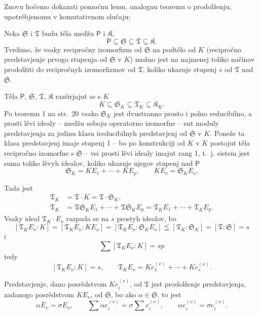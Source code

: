 \documentclass[11pt]{article}
\begin{document}
Znovu hočemo dokazati pomoćnu lemu, analognu teoremu o prodolženju, upotrěbjenomu v komutativnom slučaju:

Neka \(\mathfrak S\) i \(\mathfrak T\) budu těla medžu \(\mathsf P\) i \(\mathfrak K\),
\[
\mathsf P \subseteq \mathfrak S \subseteq \mathfrak T \subseteq \mathfrak K.
\]
Tvrdimo, že vsaky recipročny izomorfizm od \(\mathfrak S\) na podtělo od \(K\) (recipročno predstavjenje prvogo stupenja od \(\mathfrak S\) v \(K\)) možno jest na najmenej toliko načinov prodolžiti do recipročnyh izomorfizmov od \(\mathfrak T\), koliko ukazuje stupenj \(s\) od \(\mathfrak T\) nad \(\mathfrak S\).

Těla \(\mathsf P\), \(\mathfrak S\), \(\mathfrak T\), \(\mathfrak K\) razširjajut se s \(K\)
\[
K\subseteq \mathfrak S_K\subseteq \mathfrak T_K\subseteq \mathfrak K_K.
\]
Po teoremu 1 na str.~20 vsako \(\mathfrak S_K\) jest dvustranno prosto i polno reducibilno, a prosti lěvi idealy -- medžu soboju operatorno izomorfne -- sut moduly predstavjenja za jedinu klasu ireducibilnyh predstavjenj od \(\mathfrak S\) v \(K\). Poneže ta klasa predstavjenj imaje stupenj 1 -- bo po konstrukciji od \(K\) v \(K\) postojut těla recipročno izomorfne s \(\mathfrak S\) -- vsi prosti lěvi idealy imajut rang 1, t.~j. sistem jest suma toliko lěvyh idealov, koliko ukazuje njegov stupenj nad \(\mathsf P\)
\[
\mathfrak S_K=K E_1+\cdots+K E_p,\qquad K E_\nu=\mathfrak S_K E_\nu.
\]

Tada jest
\[
\begin{aligned}
\mathfrak T_K&=\mathfrak T\cdot K=\mathfrak T\cdot \mathfrak S_K,\\
\mathfrak T_K&=\mathfrak T\mathfrak S_K E_1+\cdots+\mathfrak T\mathfrak S_K E_p
              =\mathfrak T_K E_1+\cdots+\mathfrak T_K E_p.
\end{aligned}
\]
Vsaky ideal \(\mathfrak T_K\cdot E_\nu\) razpada se na \(s\) prostyh idealov, bo
\[
[\mathfrak T_K E_\nu:K]=[\mathfrak T_K E_\nu:K E_\nu]=[\mathfrak T_K E_\nu:\mathfrak S_K E_\nu]\leqq[\mathfrak T_K:\mathfrak S_K]=[\mathfrak T:\mathfrak S]=s
\]
i
\[
\sum [\mathfrak T_K E_\nu:K]=sp
\]
tedy
\[
[\mathfrak T_K E_\nu:K]=s,
\qquad
\mathfrak T_K E_\nu=K e_1^{(\nu)}+\cdots+K e_s^{(\nu)}.
\]

Predstavjenje, dano posrědstvom \(K e_i^{(\nu)}\), od \(\mathfrak T\) jest prodolženje predstavjenja, zadanogo posrědstvom \(K E_\nu\), od \(\mathfrak S\), bo ako \(\alpha\in \mathfrak S\), to jest
\[
\alpha E_\nu=\sigma E_\nu,\qquad
\sum \alpha e_i^{(\nu)}=\sigma\sum e_i^{(\nu)},\qquad
\alpha e_i^{(\nu)}=\sigma e_i^{(\nu)}.
\]
\end{document}
